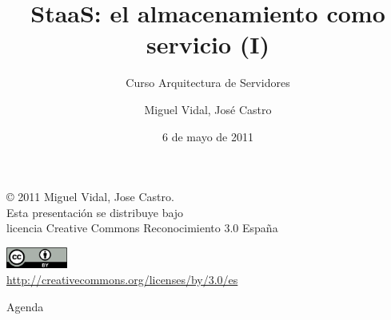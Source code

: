 \documentclass{beamer}
\begin{document}
\title{StaaS: el almacenamiento como servicio (I)}
\subtitle{Curso Arquitectura de Servidores}
\author{Miguel Vidal, José Castro}
\date{6 de mayo de 2011}


\begin{frame}
  \vspace{2cm}
  \begin{flushright}
    {\footnotesize \copyright{} 2011 Miguel Vidal, Jose Castro.} \\
    \medskip
    {\scriptsize Esta presentación se distribuye bajo \\ licencia Creative Commons Reconocimiento 3.0 España}
  \end{flushright}
  \begin{center}
    \href{http://creativecommons.org/licenses/by/3.0/es}{\includegraphics[width=2cm]{format/cc-by.png}} \\
    {\tiny \url{http://creativecommons.org/licenses/by/3.0/es}}
  \end{center}
\end{frame}%


\normalsize

\begin{frame}{Agenda}
\tableofcontents
\end{frame}


\end{document}
